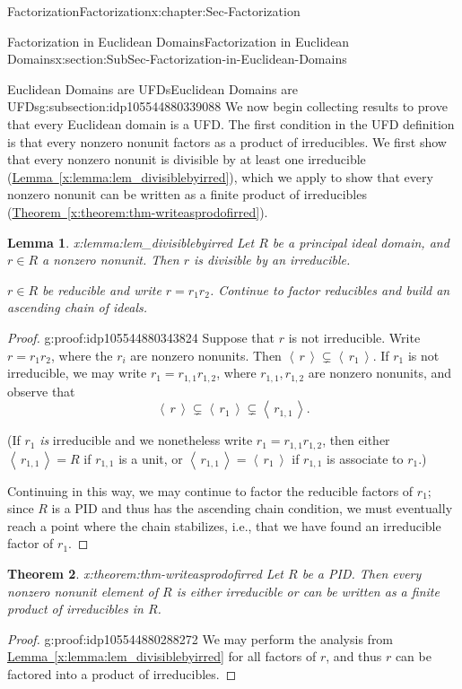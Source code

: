 \documentclass[oneside,10pt,]{book}
\newcommand{\xreffont}{\relax}
\numberwithin{equation}{section}
\newcommand{\ideal}[1]{\left\langle\, #1 \,\right\rangle}
\newtheorem{theorem}{Theorem}[section]
\newtheorem{lemma}[theorem]{Lemma}
\begin{document}
\begin{chapterptx}{Factorization}{}{Factorization}{}{}{x:chapter:Sec-Factorization}
\begin{sectionptx}{Factorization in Euclidean Domains}{}{Factorization in Euclidean Domains}{}{}{x:section:SubSec-Factorization-in-Euclidean-Domains}
\begin{subsectionptx}{Euclidean Domains are UFDs}{}{Euclidean Domains are UFDs}{}{}{g:subsection:idp105544880339088}
We now begin collecting results to prove that every Euclidean domain is a UFD. The first condition in the UFD definition is that every nonzero nonunit factors as a product of irreducibles. We first show that every nonzero nonunit is divisible by at least one irreducible (\hyperref[x:lemma:lem_divisiblebyirred]{Lemma~{\xreffont\ref{x:lemma:lem_divisiblebyirred}}}), which we apply to show that every nonzero nonunit can be written as a finite product of irreducibles (\hyperref[x:theorem:thm-writeasprodofirred]{Theorem~{\xreffont\ref{x:theorem:thm-writeasprodofirred}}}).%
\begin{lemma}{}{}{x:lemma:lem_divisiblebyirred}%
Let \(R\) be a principal ideal domain, and \(r\in R\) a nonzero nonunit. Then \(r\) is divisible by an irreducible.%
\par\smallskip%
\noindentLet \(r\in R\) be reducible and write \(r = r_1 r_2\). Continue to factor reducibles and build an ascending chain of ideals.%
\end{lemma}
\begin{proof}{}{g:proof:idp105544880343824}
Suppose that \(r\) is not irreducible. Write \(r = r_1 r_2\), where the \(r_i\) are nonzero nonunits. Then \(\ideal{r} \subsetneq \ideal{r_1}\). If \(r_1\) is not irreducible, we may write \(r_1 = r_{1,1}r_{1,2}\), where \(r_{1,1},r_{1,2}\) are nonzero nonunits, and observe that%
\begin{equation*}
\ideal{r} \subsetneq \ideal{r_1}\subsetneq \ideal{r_{1,1}}\text{.}
\end{equation*}
%
\par
(If \(r_1\) \emph{is} irreducible and we nonetheless write \(r_1 = r_{1,1} r_{1,2}\), then either \(\ideal{r_{1,1}} = R\) if \(r_{1,1}\) is a unit, or \(\ideal{r_{1,1}} = \ideal{r_1}\) if \(r_{1,1}\) is associate to \(r_1\).)%
\par
Continuing in this way, we may continue to factor the reducible factors of \(r_1\); since \(R\) is a PID and thus has the ascending chain condition, we must eventually reach a point where the chain stabilizes, i.e., that we have found an irreducible factor of \(r_1\).%
\end{proof}
\begin{theorem}{}{}{x:theorem:thm-writeasprodofirred}%
Let \(R\) be a PID. Then every nonzero nonunit element of \(R\) is either irreducible or can be written as a finite product of irreducibles in \(R\).%
\end{theorem}
\begin{proof}{}{g:proof:idp105544880288272}
We may perform the analysis from \hyperref[x:lemma:lem_divisiblebyirred]{Lemma~{\xreffont\ref{x:lemma:lem_divisiblebyirred}}} for all factors of \(r\), and thus \(r\) can be factored into a product of irreducibles.%

\end{proof}
\end{subsectionptx}
\end{sectionptx}
\end{chapterptx}
\end{document}

